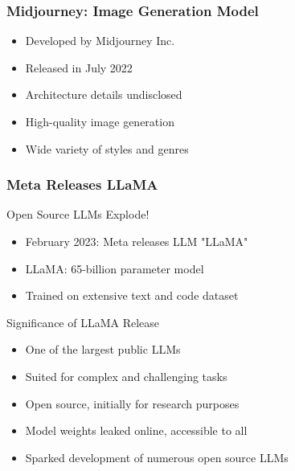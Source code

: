 
\begin{frame}[fragile]\frametitle{Midjourney: Image Generation Model}
    
    \begin{itemize}
        \item Developed by Midjourney Inc.
        \item Released in July 2022
        \item Architecture details undisclosed
        \item High-quality image generation
        \item Wide variety of styles and genres
    \end{itemize}
	
\end{frame}

\begin{frame}[fragile]\frametitle{Meta Releases LLaMA}

Open Source LLMs Explode!
 
    \begin{itemize}
        \item February 2023: Meta releases LLM "LLaMA"
        \item LLaMA: 65-billion parameter model
        \item Trained on extensive text and code dataset
    \end{itemize}
	
Significance of LLaMA Release

    \begin{itemize}
        \item One of the largest public LLMs
        \item Suited for complex and challenging tasks
        \item Open source, initially for research purposes
        \item Model weights leaked online, accessible to all
        \item Sparked development of numerous open source LLMs
    \end{itemize}
\end{frame}


